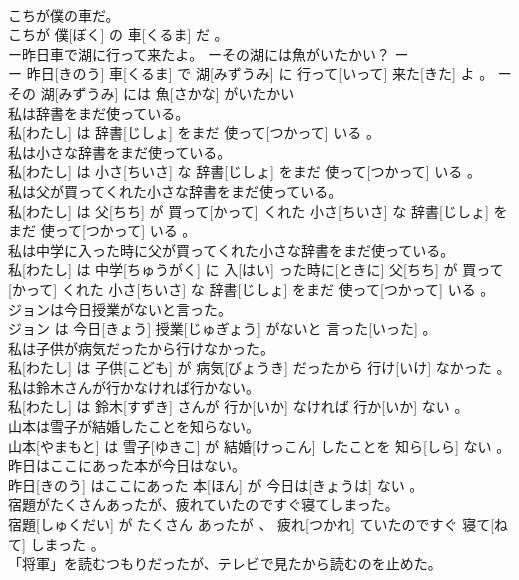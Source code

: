 \documentclass[8pt]{extreport}
\begin{document}
\begin{CJK}{UTF8}{min}
\\	こちが僕の車だ。	
\\	こちが 僕[ぼく] の 車[くるま] だ 。
\\	ー昨日車で湖に行って来たよ。 ーその湖には魚がいたかい？	ー
\\	ー 昨日[きのう] 車[くるま] で 湖[みずうみ] に 行って[いって] 来た[きた] よ 。 ー その 湖[みずうみ] には 魚[さかな] がいたかい 
\\	私は辞書をまだ使っている。	
\\	私[わたし] は 辞書[じしょ] をまだ 使って[つかって] いる 。
\\	私は小さな辞書をまだ使っている。	
\\	私[わたし] は 小さ[ちいさ] な 辞書[じしょ] をまだ 使って[つかって] いる 。
\\	私は父が買ってくれた小さな辞書をまだ使っている。	
\\	私[わたし] は 父[ちち] が 買って[かって] くれた 小さ[ちいさ] な 辞書[じしょ] をまだ 使って[つかって] いる 。
\\	私は中学に入った時に父が買ってくれた小さな辞書をまだ使っている。	
\\	私[わたし] は 中学[ちゅうがく] に 入[はい] った時に[ときに] 父[ちち] が 買って[かって] くれた 小さ[ちいさ] な 辞書[じしょ] をまだ 使って[つかって] いる 。
\\	ジョンは今日授業がないと言った。	
\\	ジョン は 今日[きょう] 授業[じゅぎょう] がないと 言った[いった] 。
\\	私は子供が病気だったから行けなかった。	
\\	私[わたし] は 子供[こども] が 病気[びょうき] だったから 行け[いけ] なかった 。
\\	私は鈴木さんが行かなければ行かない。	
\\	私[わたし] は 鈴木[すずき] さんが 行か[いか] なければ 行か[いか] ない 。
\\	山本は雪子が結婚したことを知らない。	
\\	山本[やまもと] は 雪子[ゆきこ] が 結婚[けっこん] したことを 知ら[しら] ない 。
\\	昨日はここにあった本が今日はない。	
\\	昨日[きのう] はここにあった 本[ほん] が 今日は[きょうは] ない 。
\\	宿題がたくさんあったが、疲れていたのですぐ寝てしまった。	
\\	宿題[しゅくだい] が たくさん あったが 、 疲れ[つかれ] ていたのですぐ 寝て[ねて] しまった 。
\\	「将軍」を読むつもりだったが、テレビで見たから読むのを止めた。	

\end{CJK}
\end{document}
